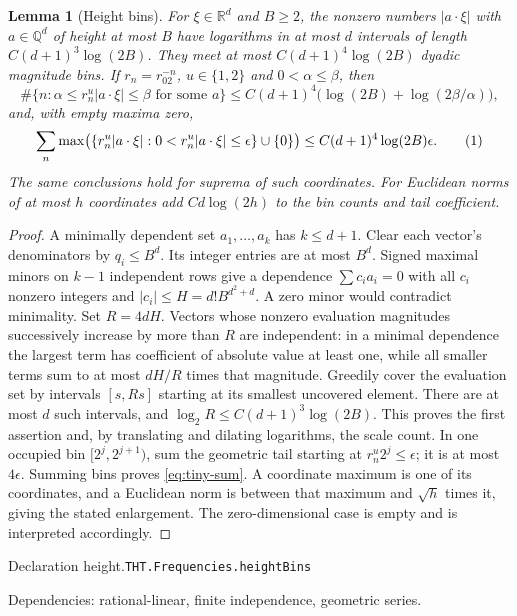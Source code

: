 \documentclass[11pt]{article}
\newtheorem{lemma}[theorem]{Lemma}
\theoremstyle{definition}
\newcommand{\R}{\mathbb R}
\newcommand{\Q}{\mathbb Q}
\newcommand{\eqtag}[1]{\refstepcounter{equation}\tag{\theequation}\label{#1}}
\numberwithin{equation}{section}
\newcommand{\bp}[3]{\par\smallskip\begingroup\footnotesize
\noindent\hypertarget{bp:#1}{\textsf{Declaration #1.}}\quad\nolinkurl{#2}\par
\noindent\textsf{Dependencies:} #3.\par\endgroup\smallskip}
\begin{document}
\begin{lemma}[Height bins]\label{lem:height}
For $\xi\in\R^d$ and $B\ge2$, the nonzero numbers $|a\cdot\xi|$ with $a\in\Q^d$ of height at most $B$ have logarithms in at most $d$ intervals of length $C(d+1)^3\log(2B)$. They meet at most $C(d+1)^4\log(2B)$ dyadic magnitude bins. If $r_n=r_02^{-n}$, $u\in\{1,2\}$ and $0<\alpha\le\beta$, then
\[
 \#\{n:\alpha\le r_n^u|a\cdot\xi|\le\beta\text{ for some }a\}
 \le C(d+1)^4\bigl(\log(2B)+\log(2\beta/\alpha)\bigr),
\]
and, with empty maxima zero,
\[
 \sum_n\max\bigl(\{r_n^u|a\cdot\xi|:0<r_n^u|a\cdot\xi|\le\epsilon\}\cup\{0\}\bigr)
 \le C(d+1)^4\log(2B)\epsilon.
 \eqtag{eq:tiny-sum}
\]
The same conclusions hold for suprema of such coordinates. For Euclidean norms of at most $h$ coordinates add $Cd\log(2h)$ to the bin counts and tail coefficient.
\end{lemma}
\begin{proof}
A minimally dependent set $a_1,\ldots,a_k$ has $k\le d+1$. Clear each vector's denominators by $q_i\le B^d$. Its integer entries are at most $B^d$. Signed maximal minors on $k-1$ independent rows give a dependence $\sum c_ia_i=0$ with all $c_i$ nonzero integers and $|c_i|\le H=d!B^{d^2+d}$. A zero minor would contradict minimality. Set $R=4dH$. Vectors whose nonzero evaluation magnitudes successively increase by more than $R$ are independent: in a minimal dependence the largest term has coefficient of absolute value at least one, while all smaller terms sum to at most $dH/R$ times that magnitude. Greedily cover the evaluation set by intervals $[s,Rs]$ starting at its smallest uncovered element. There are at most $d$ such intervals, and $\log_2R\le C(d+1)^3\log(2B)$. This proves the first assertion and, by translating and dilating logarithms, the scale count. In one occupied bin $[2^j,2^{j+1})$, sum the geometric tail starting at $r_n^u2^j\le\epsilon$; it is at most $4\epsilon$. Summing bins proves \eqref{eq:tiny-sum}. A coordinate maximum is one of its coordinates, and a Euclidean norm is between that maximum and $\sqrt h$ times it, giving the stated enlargement. The zero-dimensional case is empty and is interpreted accordingly.
\end{proof}
\bp{height}{THT.Frequencies.heightBins}{rational-linear, finite independence, geometric series}
\end{document}
